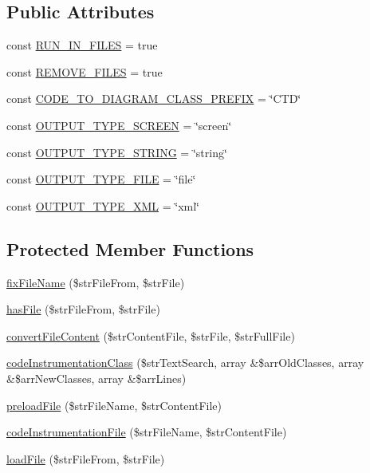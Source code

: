 \subsection*{Public Attributes}
\begin{CompactItemize}
\item 
const \hyperlink{class_code_to_diagram_2cec53b0c2258fcbb3ecefc5d8788fb0}{RUN\_\-IN\_\-FILES} = true
\item 
const \hyperlink{class_code_to_diagram_2832af3e5aa01936d5bcec53d500e7ab}{REMOVE\_\-FILES} = true
\item 
const \hyperlink{class_code_to_diagram_acb520be3f3e0ee2cd05b90c8d9887a6}{CODE\_\-TO\_\-DIAGRAM\_\-CLASS\_\-PREFIX} = \char`\"{}CTD\char`\"{}
\item 
const \hyperlink{class_code_to_diagram_746cadd14bdda9d3c0ae3c4433bc2478}{OUTPUT\_\-TYPE\_\-SCREEN} = \char`\"{}screen\char`\"{}
\item 
const \hyperlink{class_code_to_diagram_7b2a676828728d3c85df18eebb42854f}{OUTPUT\_\-TYPE\_\-STRING} = \char`\"{}string\char`\"{}
\item 
const \hyperlink{class_code_to_diagram_6432f4d95031e2666449bb92c20f7d7e}{OUTPUT\_\-TYPE\_\-FILE} = \char`\"{}file\char`\"{}
\item 
const \hyperlink{class_code_to_diagram_04b49bbd2c3e914e22a80db89997dd67}{OUTPUT\_\-TYPE\_\-XML} = \char`\"{}xml\char`\"{}
\end{CompactItemize}
\subsection*{Protected Member Functions}
\begin{CompactItemize}
\item 
\hyperlink{class_code_to_diagram_ba72ffc8b4aeabbd33a7206c395ede18}{fixFileName} (\$strFileFrom, \$strFile)
\item 
\hyperlink{class_code_to_diagram_e4efdbde4a95c06ac22d842b8d56a1de}{hasFile} (\$strFileFrom, \$strFile)
\item 
\hyperlink{class_code_to_diagram_4ae436da9e8fe29b6ce2aa543212fa72}{convertFileContent} (\$strContentFile, \$strFile, \$strFullFile)
\item 
\hyperlink{class_code_to_diagram_ec172f2211fc097efa89f3546c0bd308}{codeInstrumentationClass} (\$strTextSearch, array \&\$arrOldClasses, array \&\$arrNewClasses, array \&\$arrLines)
\item 
\hyperlink{class_code_to_diagram_5300582d74e4550799d8bc8dffb4af19}{preloadFile} (\$strFileName, \$strContentFile)
\item 
\hyperlink{class_code_to_diagram_39823f54aa950aa83d7f0786ae2d2922}{codeInstrumentationFile} (\$strFileName, \$strContentFile)
\item 
\hyperlink{class_code_to_diagram_46cc51b5da83819fed739bd1d8b1d2ca}{loadFile} (\$strFileFrom, \$strFile)
\end{CompactItemize}
